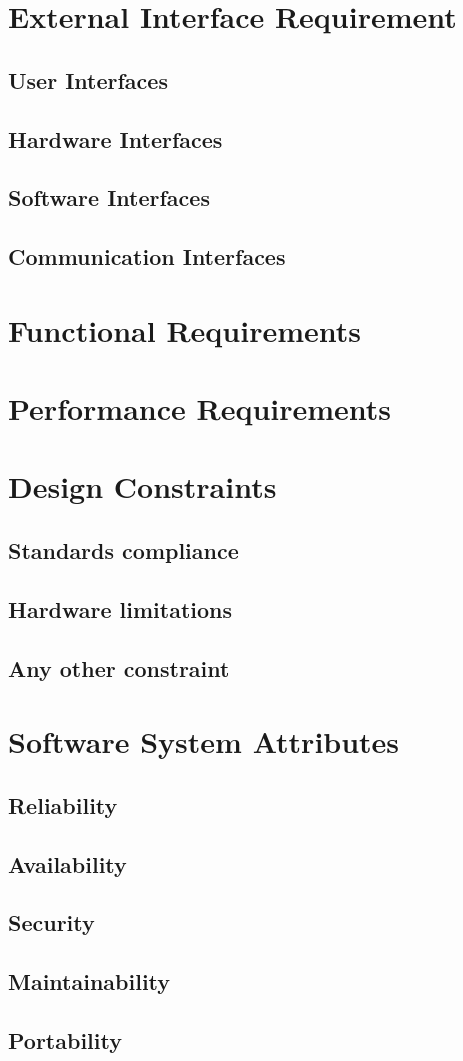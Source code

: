 \section{External Interface Requirement}
\subsection{User Interfaces}
\subsection{Hardware Interfaces}
\subsection{Software Interfaces}
\subsection{Communication Interfaces}

\section{Functional Requirements}

\section{Performance Requirements}

\section{Design Constraints}
\subsection{Standards compliance}
\subsection{Hardware limitations}
\subsection{Any other constraint}

\section{Software System Attributes}
\subsection{Reliability}
\subsection{Availability}
\subsection{Security}
\subsection{Maintainability}
\subsection{Portability}